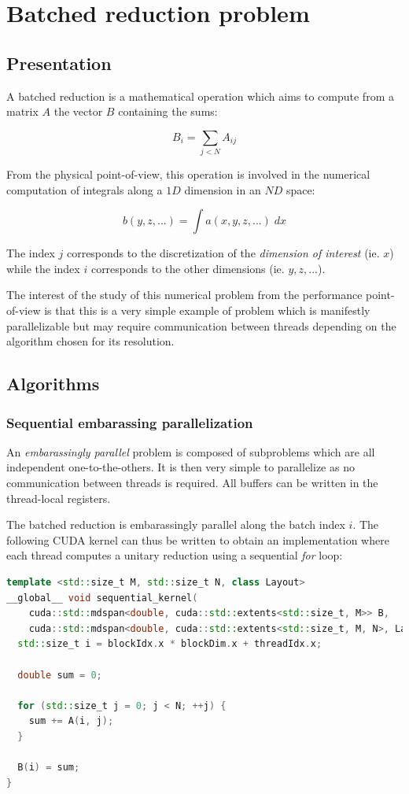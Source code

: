 \documentclass{article}
\begin{document}
\section{Batched reduction problem}

\subsection{Presentation}

A batched reduction is a mathematical operation which aims to compute from a matrix $A$ the vector $B$ containing the sums:

\[
B_i = \sum_{j<N} A_{ij}
\]

From the physical point-of-view, this operation is involved in the numerical computation of integrals along a $1D$ dimension in an $ND$ space:

\[
b(y, z, ...) = \int a(x, y, z, ...)\; dx
\]

The index $j$ corresponds to the discretization of the \textit{dimension of interest} (ie. $x$) while the index $i$ corresponds to the other dimensions (ie. $y, z, ...$).

The interest of the study of this numerical problem from the performance point-of-view is that this is a very simple example of problem which is manifestly parallelizable but may require communication between threads depending on the algorithm chosen for its resolution.

\subsection{Algorithms}

\subsubsection{Sequential embarassing parallelization}

An \textit{embarassingly parallel} problem is composed of subproblems which are all independent one-to-the-others. It is then very simple to parallelize as no communication between threads is required. All buffers can be written in the thread-local registers.

The batched reduction is embarassingly parallel along the batch index $i$. The following CUDA kernel can thus be written to obtain an implementation where each thread computes a unitary reduction using a sequential \textit{for} loop:

\begin{lstlisting}[language=C++]
template <std::size_t M, std::size_t N, class Layout>
__global__ void sequential_kernel(
    cuda::std::mdspan<double, cuda::std::extents<std::size_t, M>> B,
    cuda::std::mdspan<double, cuda::std::extents<std::size_t, M, N>, Layout> A) {
  std::size_t i = blockIdx.x * blockDim.x + threadIdx.x;

  double sum = 0;

  for (std::size_t j = 0; j < N; ++j) {
    sum += A(i, j);
  }

  B(i) = sum;
}
\end{lstlisting}
\end{document}
